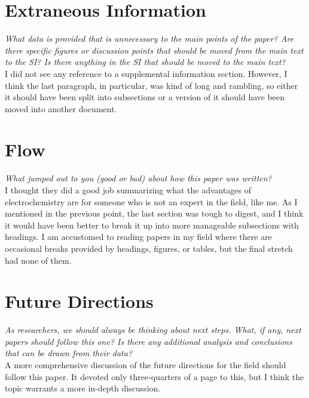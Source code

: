 \documentclass[12pt]{article}
\begin{document}
\section*{Extraneous Information}
\textit{What data is provided that is unnecessary to the main points of the paper? Are there specific figures or discussion points that should be moved from the main text to the SI? Is there anything in the SI that should be moved to the main text?}\\[4pt]
I did not see any reference to a supplemental information section. However, I think the last paragraph, in particular, was kind of long and rambling, so either it should have been split into subsections or a version of it should have been moved into another document.

\section*{Flow}
\textit{What jumped out to you (good or bad) about how this paper was written?}\\[4pt]
I thought they did a good job summarizing what the advantages of electrochemistry are for someone who is not an expert in the field, like me. As I mentioned in the previous point, the last section was tough to digest, and I think it would have been better to break it up into more manageable subsections with headings. I am accustomed to reading papers in my field where there are occasional breaks provided by headings, figures, or tables, but the final stretch had none of them.

\section*{Future Directions}
\textit{As researchers, we should always be thinking about next steps. What, if any, next papers should follow this one? Is there any additional analysis and conclusions that can be drawn from their data?}\\[4pt]
A more comprehensive discussion of the future directions for the field should follow this paper. It devoted only three-quarters of a page to this, but I think the topic warrants a more in-depth discussion.
\end{document}
